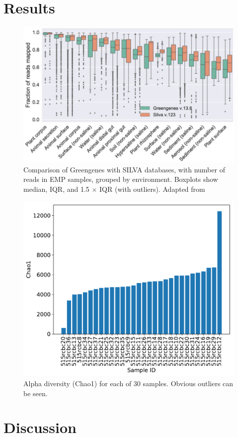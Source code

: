\documentclass{article}
\begin{document}
\begin{multicols}{2}

\section{Results}



\begin{figure}[H]
	\includegraphics[width=1\linewidth]{./figs/EMP_SILVA.jpg}
	\caption{Comparison of Greengenes with SILVA databases, with number of reads in EMP samples, grouped by environment. Boxplots show median, IQR, and 1.5 × IQR (with outliers). Adapted from \cite{Thompson2017}}
	\label{fig:EMP_Silva}
\end{figure}



\begin{figure}[H]
	\includegraphics[width=\linewidth]{../analyses/figs/chao1_alpha.pdf}
	\caption{Alpha diversity (Chao1) for each of 30 samples. Obvious outliers can be seen.}
	\label{fig:alpha_diversity}
\end{figure}
\section{Discussion}




\end{multicols}
\end{document}
